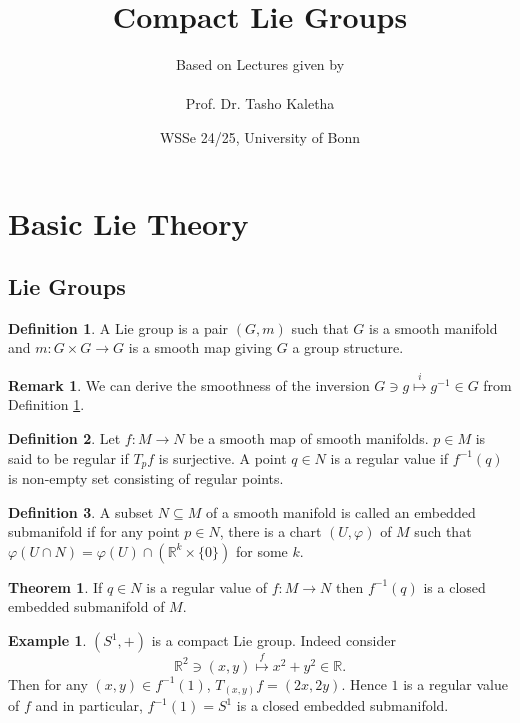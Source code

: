 \documentclass[10pt]{article}
\title{Compact Lie Groups}
\author{Based on Lectures given by\\\\Prof. Dr. Tasho Kaletha}
\date{WSSe 24/25, University of Bonn}
\numberwithin{equation}{section}
\theoremstyle{definition}
\newtheorem{theorem}{Theorem} [section]
\newtheorem{definition}{Definition}[section]
\newtheorem{remark}{Remark}[section]
\newtheorem{example}{Example}[section]
\newcommand{\R}[0]{\mathbb{R}}
\begin{document}
\maketitle

\section{Basic Lie Theory}

\subsection{Lie Groups}

\begin{definition}
    \label{definition_1_1}
    A Lie group is a pair $(G,m)$ such that $G$ is a smooth manifold and $m:G\times G\to G$ is a smooth map giving $G$ a group structure.
\end{definition}
\begin{remark}
    We can derive the smoothness of the inversion $G\ni g\stackrel{i}{\mapsto} g^{-1}\in G$ from Definition \ref{definition_1_1}.
\end{remark}

\begin{definition}
    Let $f:M\to N$ be a smooth map of smooth manifolds. $p\in M$ is said to be regular if $T_pf$ is surjective. A point $q\in N$ is a regular value if $f^{-1}(q)$ is non-empty set consisting of regular points.
\end{definition}

\begin{definition}
    A subset $N\subseteq M$ of a smooth manifold is called an embedded submanifold if for any point $p\in N$, there is a chart $(U,\varphi)$ of $M$ such that $\varphi(U\cap N)=\varphi(U)\cap (\R^k\times\{0\})$ for some $k$.
\end{definition}

\begin{theorem}
    If $q\in N$ is a regular value of $f:M\to N$ then $f^{-1}(q)$ is a closed embedded submanifold of $M$.
\end{theorem}

\begin{example}
    $(S^1,+)$ is a compact Lie group. Indeed consider 
    \begin{equation*}
    \R^2\ni(x,y)\stackrel{f}{\mapsto}x^2+y^2\in\R.
    \end{equation*}
    Then for any $(x,y)\in f^{-1}(1)$, $T_{(x,y)}f = (2x,2y)$. Hence $1$ is a regular value of $f$ and in particular, $f^{-1}(1) = S^1$ is a closed embedded submanifold.
\end{example}
\end{document}
